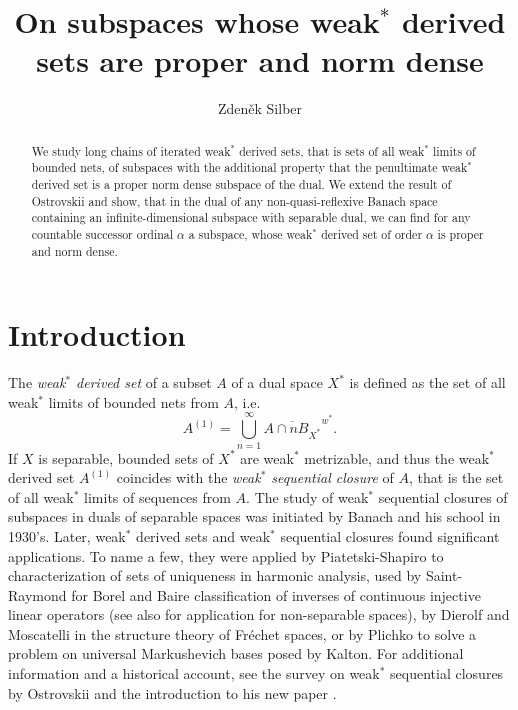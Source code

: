 \documentclass{amsart}
\title{On subspaces whose weak$^*$ derived sets are proper and norm dense}
\author[Z. Silber]{Zdeněk Silber}
\theoremstyle{definition}
\begin{document}
\begin{abstract}
    We study long chains of iterated weak$^*$ derived sets, that is sets of all weak$^*$ limits of bounded nets, of subspaces with the additional property that the penultimate weak$^*$ derived set is a proper norm dense subspace of the dual. We extend the result of Ostrovskii and show, that in the dual of any non-quasi-reflexive Banach space containing an infinite-dimensional subspace with separable dual, we can find for any countable successor ordinal $\alpha$ a subspace, whose weak$^*$ derived set of order $\alpha$ is proper and norm dense.
\end{abstract}

\maketitle

\section{Introduction}

The \textit{weak$^*$ derived set} of a subset $A$ of a dual space $X^*$ is defined as the set of all weak$^*$ limits of bounded nets from $A$, i.e.
\begin{equation*}
    A^{(1)} = \bigcup_{n=1}^\infty \overline{A \cap n B_{X^*}}^{w^*}.
\end{equation*}
If $X$ is separable, bounded sets of $X^*$ are weak$^*$ metrizable, and thus the weak$^*$ derived set $A^{(1)}$ coincides with the \textit{weak$^*$ sequential closure} of $A$, that is the set of all weak$^*$ limits of sequences from $A$. The study of  weak$^*$ sequential closures of subspaces in duals of separable spaces was initiated by Banach \cite{Banach1934} and his school in 1930's. Later, weak$^*$ derived sets and weak$^*$ sequential closures found  significant applications. To name a few, they were applied by Piatetski-Shapiro \cite{piatetski1952} to characterization of sets of uniqueness in harmonic analysis, used by Saint-Raymond \cite{SaintRaymond1976} for Borel and Baire classification of inverses of continuous injective linear operators (see also \cite{Raja2004} for application for non-separable spaces), by Dierolf and Moscatelli \cite{DierolfMoscatelli1987} in the structure theory of Fréchet spaces, or by Plichko \cite{Plichko1986} to solve a problem on universal Markushevich bases posed by Kalton. For additional information and a historical account, see the survey on weak$^*$ sequential closures by Ostrovskii \cite{ostro2001} and the introduction to his new paper \cite{Ostro2022}.
\end{document}
